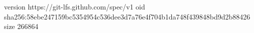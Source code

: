 version https://git-lfs.github.com/spec/v1
oid sha256:58ebe247159bc5354954c536dee3d7a76e4f704b1da748f439848bd9d2b88426
size 266864
